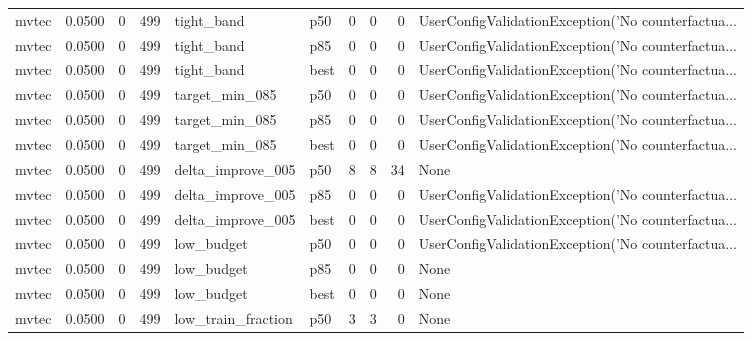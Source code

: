 \begin{tabular}{lrrrllrrrl}
   mvtec &    0.0500 &    0 &    499 &           tight\_band &    p50 &               0 &          0 &       0 & UserConfigValidationException('No counterfactua... \\
   mvtec &    0.0500 &    0 &    499 &           tight\_band &    p85 &               0 &          0 &       0 & UserConfigValidationException('No counterfactua... \\
   mvtec &    0.0500 &    0 &    499 &           tight\_band &   best &               0 &          0 &       0 & UserConfigValidationException('No counterfactua... \\
   mvtec &    0.0500 &    0 &    499 &       target\_min\_085 &    p50 &               0 &          0 &       0 & UserConfigValidationException('No counterfactua... \\
   mvtec &    0.0500 &    0 &    499 &       target\_min\_085 &    p85 &               0 &          0 &       0 & UserConfigValidationException('No counterfactua... \\
   mvtec &    0.0500 &    0 &    499 &       target\_min\_085 &   best &               0 &          0 &       0 & UserConfigValidationException('No counterfactua... \\
   mvtec &    0.0500 &    0 &    499 &    delta\_improve\_005 &    p50 &               8 &          8 &      34 &                                               None \\
   mvtec &    0.0500 &    0 &    499 &    delta\_improve\_005 &    p85 &               0 &          0 &       0 & UserConfigValidationException('No counterfactua... \\
   mvtec &    0.0500 &    0 &    499 &    delta\_improve\_005 &   best &               0 &          0 &       0 & UserConfigValidationException('No counterfactua... \\
   mvtec &    0.0500 &    0 &    499 &           low\_budget &    p50 &               0 &          0 &       0 & UserConfigValidationException('No counterfactua... \\
   mvtec &    0.0500 &    0 &    499 &           low\_budget &    p85 &               0 &          0 &       0 &                                               None \\
   mvtec &    0.0500 &    0 &    499 &           low\_budget &   best &               0 &          0 &       0 &                                               None \\
   mvtec &    0.0500 &    0 &    499 &   low\_train\_fraction &    p50 &               3 &          3 &       0 &                                               None \\

\end{tabular}
